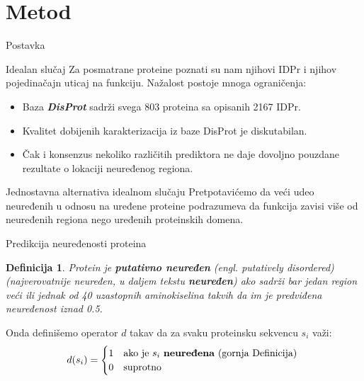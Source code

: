 \documentclass{beamer}
\newcommand{\en}[1]{(engl. \textit{#1})}
\newcommand{\keyword}[1]{\textbf{#1}}
\newtheorem{definicija}{Definicija}
\begin{document}
\section{Metod}



\begin{frame}{Postavka}
  \begin{block}{Idealan slučaj}
    Za posmatrane proteine poznati su nam njihovi IDPr i njihov pojedinačajn
    uticaj na funkciju.    Nažalost postoje mnoga ograničenja:
    \begin{itemize}
      \item Baza \textit{\keyword{DisProt}} sadrži svega 803 proteina sa
        opisanih 2167 IDPr.  

      \item Kvalitet dobijenih karakterizacija iz baze DisProt je diskutabilan.
        

      \item Čak i konsenzus nekoliko različitih prediktora ne daje dovoljno
        pouzdane rezultate o lokaciji neuređenog regiona.
    \end{itemize}
  \end{block}

  

  \begin{block}{Jednostavna alternativa idealnom slučaju}
    Pretpotavićemo da veći udeo neuređenih u odnosu na uređene proteine podrazumeva
    da funkcija zavisi više od neuređenih regiona nego uređenih proteinskih domena. 
  \end{block}
\end{frame}


\begin{frame}{Predikcija neuređenosti proteina}
  \begin{definicija}
    \label{pdis_def}
    Protein je \keyword{putativno neuređen} \en{putatively disordered}
    (najverovatnije neuređen, u daljem tekstu \keyword{neuređen}) ako sadrži bar
    jedan region veći ili jednak od 40 uzastopnih aminokiselina takvih da im je
    predviđena neuređenost iznad 0.5. 
  \end{definicija}

  Onda definišemo operator $d$ takav da za svaku proteinsku sekvencu $s_i$ važi:
  \[   
    d(s_i) = 
    \begin{cases}
    1 & \text{ako je  $s_i$ \keyword{neuređena} (gornja Definicija) }\\
    0 & \text{suprotno}
  \end{cases}
\]
\end{frame}
\end{document}
